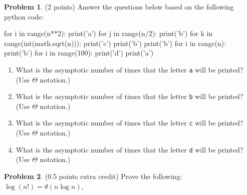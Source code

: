 \documentclass[10pt]{article}
\theoremstyle{definition}
\newtheorem{problem}{Problem}
\begin{document}
\newpage
\begin{problem}
(2 points)
Answer the questions below based on the following python code:
\begin{python}
for i in range(n**2):
    print('a')
    for j in range(n/2):
        print('b')
        for k in range(int(math.sqrt(n))):
            print('c')
        print('b')
    print('b')
for i in range(n):
    print('b')
for i in range(100):
    print('d')
    print('a')
\end{python}
\begin{enumerate}
    \item What is the asymptotic number of times that the letter \texttt{a} will be printed? 
        (Use $\Theta$ notation.)
        \vspace{1.5in}
    \item What is the asymptotic number of times that the letter \texttt{b} will be printed?
        (Use $\Theta$ notation.)
        \vspace{1.5in}
    \item What is the asymptotic number of times that the letter \texttt{c} will be printed?
        (Use $\Theta$ notation.)
        \vspace{1.5in}
    \item What is the asymptotic number of times that the letter \texttt{d} will be printed?
        (Use $\Theta$ notation.)
        \vspace{1.5in}
\end{enumerate}
\end{problem}

\newpage
\begin{problem}
    (0.5 points extra credit)
    Prove the following: $\log(n!) = \theta(n\log n)$,
\end{problem}
\end{document}
